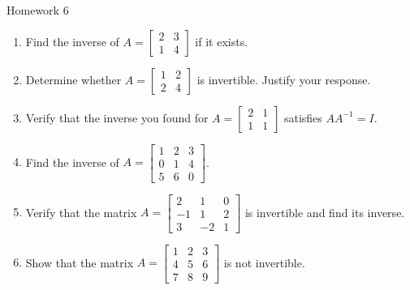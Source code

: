 \documentclass[10pt, aspectratio=169]{beamer}
\begin{document}
\begin{frame}{Homework 6}
\begin{enumerate}
    \item Find the inverse of \(A = \begin{bmatrix} 2 & 3 \\ 1 & 4 \end{bmatrix}\) if it exists.
    \item Determine whether \(A = \begin{bmatrix} 1 & 2 \\ 2 & 4 \end{bmatrix}\) is invertible. Justify your response.
    \item Verify that the inverse you found for \(A = \begin{bmatrix} 2 & 1 \\ 1 & 1 \end{bmatrix}\) satisfies \(AA^{-1} = I\).
    \item Find the inverse of \(A = \begin{bmatrix} 1 & 2 & 3 \\ 0 & 1 & 4 \\ 5 & 6 & 0 \end{bmatrix}\).
    \item Verify that the matrix \(A = \begin{bmatrix} 2 & 1 & 0 \\ -1 & 1 & 2 \\ 3 & -2 & 1 \end{bmatrix}\) is invertible and find its inverse.
    \item Show that the matrix \(A = \begin{bmatrix} 1 & 2 & 3 \\ 4 & 5 & 6 \\ 7 & 8 & 9 \end{bmatrix}\) is not invertible.
\end{enumerate}

\end{frame}
\end{document}
